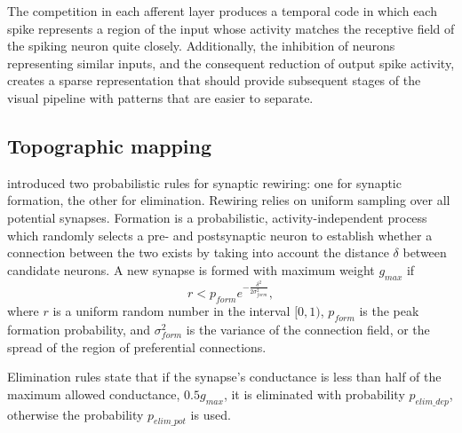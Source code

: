 \documentclass[letterpaper, 10 pt, conference]{ieeeconf}  %
\begin{document}
The competition in each afferent layer produces a temporal code in which each spike represents a region of the input whose activity matches the receptive field of the spiking neuron quite closely.
Additionally, the inhibition of neurons representing similar inputs, and the consequent reduction of output spike activity, creates a sparse representation that should provide subsequent stages of the visual pipeline with patterns that are easier to separate.


\subsection{Topographic mapping}

\cite{bamford2010synaptic} introduced two probabilistic rules for synaptic rewiring: one for synaptic formation, the other for elimination.
Rewiring relies on uniform sampling over all potential synapses. 
Formation is a probabilistic, activity-independent process which randomly selects a pre- and postsynaptic neuron to establish whether a connection between the two exists by taking into account the distance $\delta$ between candidate neurons. A new synapse is formed with maximum weight $g_{max}$ if
%
\begin{equation} \label{eq:formation_rule}
r<p_{form}e^{-\frac{\delta^2}{2\sigma^2_{form}}},
\end{equation}
%
where $r$ is a uniform random number in the interval $[0, 1)$, $p_{form}$ is the peak formation probability, and $\sigma^2_{form}$ is the variance of the connection field, or the spread of the region of preferential connections.

Elimination rules state that if the synapse's conductance is less than half of the maximum allowed conductance, $0.5g_{max}$, it is eliminated with probability $p_{elim\_dep}$, otherwise the probability $p_{elim\_pot}$ is used.
\end{document}
